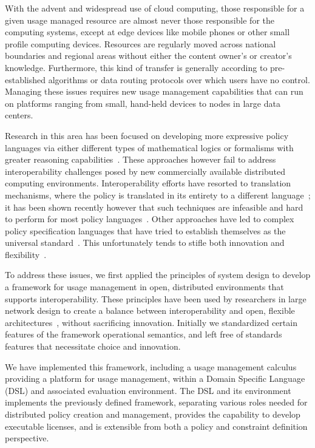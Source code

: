\documentclass{acm_proc_article-sp}
\begin{document}
With the advent and widespread use of cloud computing, those responsible for a given usage managed resource are almost never those responsible for the computing systems, except at edge devices like mobile phones or other small profile computing devices.  Resources are regularly moved across national boundaries and regional areas without either the content owner's or creator's knowledge.  Furthermore, this kind of transfer is generally according to pre-established algorithms or data routing protocols over which users have no control.  Managing these issues requires new usage management capabilities that can run on platforms ranging from small, hand-held devices to nodes in large data centers.

Research in this area has been focused on developing more expressive policy languages via either different types of mathematical logics or formalisms with greater reasoning capabilities~\cite{ArHu:07,BaMi:06,ChCoEtHaJoLa:03,HaWe:04,HaWe:08,PuWe:02,XiBjFu:08}.  These approaches however fail to address interoperability challenges posed by new commercially available distributed computing environments.  Interoperability efforts have resorted to translation mechanisms, where the policy is translated in its entirety to a different language~\cite{HeJa:05,PoPrDe:04,ScTaWo:04}; it has been shown recently however that such techniques are infeasible and hard to perform for most policy languages~\cite{KoLaMaMi:04, SaShUe:04}. Other approaches have led to complex policy specification languages that have tried to establish themselves as the universal standard~\cite{OMADRM,ODRL-req,Wa:04,XrML-spec}.  This unfortunately tends to stifle both innovation and flexibility~\cite{HeJa:05,JaHe:04,JaHe:08,JaHeMa:06}.

To address these issues, we first applied the principles of system design to develop a framework for usage management in open, distributed environments that supports interoperability. These principles have been used by researchers in large network design to create a balance between interoperability and open, flexible architectures~\cite{Al:04,BlCl:01,ClWrSoBr:02}, without sacrificing innovation. Initially we standardized certain features of the framework operational semantics, and left free of standards features that necessitate choice and innovation.

We have implemented this framework, including a usage management calculus providing a platform for usage management, within a Domain Specific Language (DSL) and associated evaluation environment. The DSL and its environment implements the previously defined framework, separating various roles needed for distributed policy creation and management, provides the capability to develop executable licenses, and is extensible from both a policy and constraint definition perspective.
\end{document}
